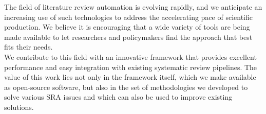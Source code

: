\documentclass[]{bmcart}
\begin{document}
The field of literature review automation is evolving rapidly, and we
anticipate an increasing use of such technologies to address the
accelerating pace of scientific production. We believe it is encouraging
that a wide variety of tools are being made available to let researchers
and policymakers find the approach that best fits their needs.\\
We contribute to this field with an innovative framework that provides
excellent performance and easy integration with existing systematic
review pipelines. The value of this work lies not only in the framework
itself, which we make available as open-source software, but also in the
set of methodologies we developed to solve various SRA issues and which
can also be used to improve existing solutions.\\


\end{document}
